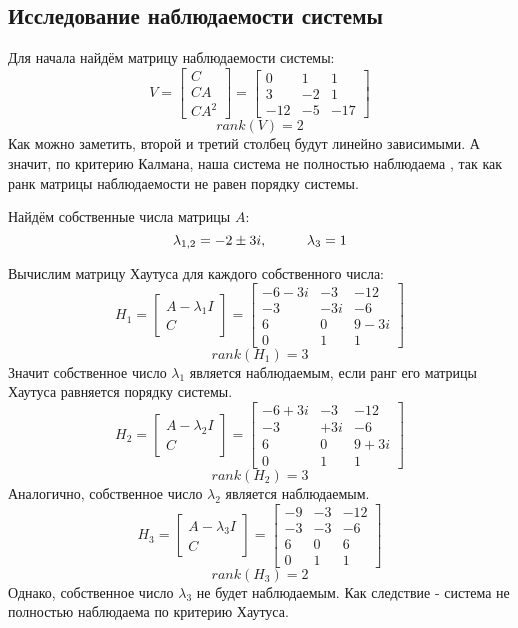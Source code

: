 \subsection{Исследование наблюдаемости системы}
Для начала найдём матрицу наблюдаемости системы:
$$
V = \begin{bmatrix}
    C \\ CA \\ CA^2
\end{bmatrix} = \begin{bmatrix}
                0   &	1	&  1 \\
                3   &   -2  &  1 \\
                -12  &    -5  &  -17
            \end{bmatrix}
$$
$$
  rank(V) = 2
$$
Как можно заметить, второй и третий столбец будут линейно зависимыми. А значит, по критерию Калмана, наша система не полностью наблюдаема , так как ранк матрицы наблюдаемости не равен порядку системы.

Найдём собственные числа матрицы $A$:
$$
    \lambda_{1,2} = -2 \pm 3i, \hspace*{1cm} \lambda_3 = 1 
$$

Вычислим матрицу Хаутуса для каждого собственного числа:
$$
    H_1 = \begin{bmatrix}
          A - \lambda_1 I \\ C   
          \end{bmatrix} = 
    \begin{bmatrix}
    -6-3i & -3 & -12  \\  
      -3 & -3i & -6  \\  
     6 & 0 & 9-3i \\ 
    0 & 1 & 1
    \end{bmatrix}
$$
$$
rank(H_1) = 3
$$
Значит собственное число $\lambda_1$ является наблюдаемым, если ранг его матрицы Хаутуса равняется порядку системы.
$$
    H_2 = \begin{bmatrix}
          A - \lambda_2 I \\ C
          \end{bmatrix} = 
        \begin{bmatrix}
            -6+3i & -3 & -12  \\  
              -3 & +3i & -6  \\  
             6 & 0 & 9+3i \\ 
              0 & 1 & 1
        \end{bmatrix}
$$
$$
rank(H_2) = 3
$$
Аналогично, собственное число $\lambda_2$ является наблюдаемым.
$$
    H_3 = \begin{bmatrix}
          A - \lambda_3 I \\ C   
          \end{bmatrix} = 
        \begin{bmatrix}
            -9 & -3 & -12  \\  
              -3 & -3 & -6  \\  
             6 & 0 & 6 \\ 
              0 & 1 & 1
        \end{bmatrix}
$$
$$
rank(H_3) = 2
$$
Однако, собственное число $\lambda_3$ не будет наблюдаемым. Как следствие - система не полностью наблюдаема по критерию Хаутуса.

